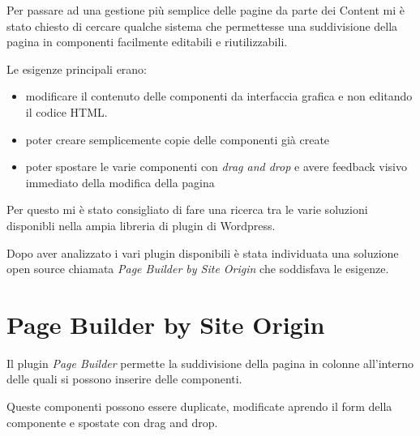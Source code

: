 


Per passare ad una gestione più semplice delle pagine da parte dei Content
mi è stato chiesto di cercare qualche sistema che permettesse una suddivisione
della pagina in componenti facilmente editabili e riutilizzabili.

Le esigenze principali erano:
\begin{itemize}
\item modificare il contenuto delle componenti da interfaccia grafica e non 
editando il codice HTML.
\item poter creare semplicemente copie delle componenti già create
\item poter spostare le varie componenti con \emph{drag and drop} e avere
feedback visivo immediato della modifica della pagina
\end{itemize}

Per questo mi è stato consigliato di fare una ricerca tra le varie soluzioni disponibli
nella ampia libreria di plugin di Wordpress.


Dopo aver analizzato i vari plugin disponibili è stata individuata una soluzione open source chiamata \emph{Page Builder by
Site Origin}\cite{PB} che soddisfava le esigenze.

\section{Page Builder by Site Origin}

Il plugin \emph{Page Builder} permette la suddivisione della pagina in colonne all'interno delle quali
si possono inserire delle componenti.

Queste componenti possono essere duplicate, modificate aprendo il form della componente e spostate
con drag and drop.


